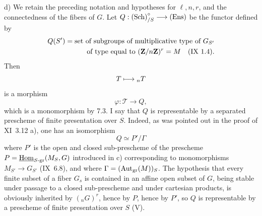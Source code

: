 d) We retain the preceding notation and hypotheses for $\ell,n,r$, and the connectedness of the fibers of $G$. Let $Q:\textup{(Sch)}^\circ_{/S}\longrightarrow\textup{(Ens)}$ be the functor defined by
\[
\begin{split}
Q(S')=\text{set of subgroups of multiplicative type of }G_{S'}\\
\text{of type equal to }(\mathbf{Z}/n\mathbf{Z})^r=M\quad\text{(IX 1.4).}
\end{split}
\]
Then
\[
T\longmapsto{}_nT
\]
is a morphism
\[
\varphi:\mathscr T\to Q,
\]
which is a monomorphism by 7.3. I say that $Q$ is representable by a separated prescheme of finite presentation over $S$. Indeed, as was pointed out in the proof of XI~3.12 a), one has an isomorphism
\[
Q\simeq P'/\Gamma
\]
where $P'$ is the open and closed sub-prescheme of the prescheme $P=\underline{\operatorname{Hom}}_{S\text{-gr}}(M_S,G)$ introduced in c) corresponding to monomorphisms $M_{S'}\to G_{S'}$ (\cf IX~6.8), and where $\Gamma=(\operatorname{Aut}_{\mathrm{gr}}(M))_S$. The hypothesis that every finite subset of a fiber $G_s$ is contained in an affine open subset of $G$, being stable under passage to a closed sub-prescheme and under cartesian products, is obviously inherited by $({}_nG)^r$, hence by $P$, hence by $P'$, so $Q$ is representable by a prescheme of finite presentation over $S$ (\cf V).

